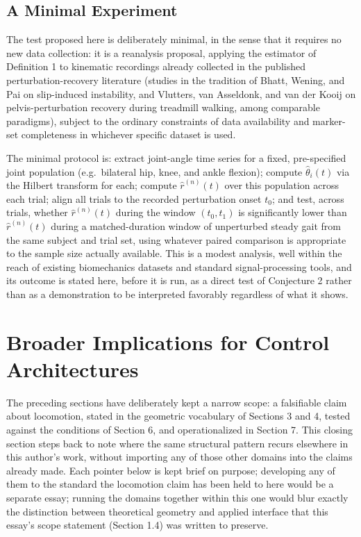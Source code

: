 \documentclass[12pt]{article}
\begin{document}
\subsection{A Minimal Experiment}

The test proposed here is deliberately minimal, in the sense that it requires no new data collection: it is a reanalysis proposal, applying the estimator of Definition 1 to kinematic recordings already collected in the published perturbation-recovery literature (studies in the tradition of Bhatt, Wening, and Pai on slip-induced instability, and Vlutters, van Asseldonk, and van der Kooij on pelvis-perturbation recovery during treadmill walking, among comparable paradigms), subject to the ordinary constraints of data availability and marker-set completeness in whichever specific dataset is used.

The minimal protocol is: extract joint-angle time series for a fixed, pre-specified joint population (e.g.\ bilateral hip, knee, and ankle flexion); compute $\hat\theta_i(t)$ via the Hilbert transform for each; compute $\hat r^{(n)}(t)$ over this population across each trial; align all trials to the recorded perturbation onset $t_0$; and test, across trials, whether $\hat r^{(n)}(t)$ during the window $(t_0, t_1)$ is significantly lower than $\hat r^{(n)}(t)$ during a matched-duration window of unperturbed steady gait from the same subject and trial set, using whatever paired comparison is appropriate to the sample size actually available. This is a modest analysis, well within the reach of existing biomechanics datasets and standard signal-processing tools, and its outcome is stated here, before it is run, as a direct test of Conjecture 2 rather than as a demonstration to be interpreted favorably regardless of what it shows.

\section{Broader Implications for Control Architectures}

The preceding sections have deliberately kept a narrow scope: a falsifiable claim about locomotion, stated in the geometric vocabulary of Sections 3 and 4, tested against the conditions of Section 6, and operationalized in Section 7. This closing section steps back to note where the same structural pattern recurs elsewhere in this author's work, without importing any of those other domains into the claims already made. Each pointer below is kept brief on purpose; developing any of them to the standard the locomotion claim has been held to here would be a separate essay; running the domains together within this one would blur exactly the distinction between theoretical geometry and applied interface that this essay's scope statement (Section 1.4) was written to preserve.
\end{document}
